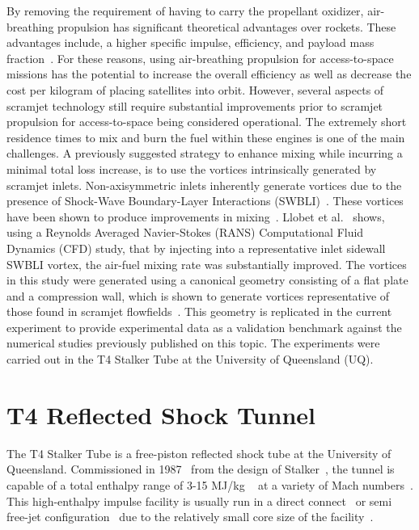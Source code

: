 \documentclass{AIAA}
\begin{document}
By removing the requirement of having to carry the propellant oxidizer, air-breathing propulsion has significant theoretical advantages over rockets.
These advantages include, a higher specific impulse, efficiency, and payload mass fraction~\cite{SmartTetlow,CookHueter}.
For these reasons, using air-breathing propulsion for access-to-space missions has the potential to increase the overall efficiency as well as decrease the cost per kilogram of placing satellites into orbit.
However, several aspects of scramjet technology still require substantial improvements prior to scramjet propulsion for access-to-space being considered operational.
The extremely short residence times to mix and burn the fuel within these engines is one of the main challenges.
A previously suggested strategy to enhance mixing while incurring a minimal total loss increase, is to use the vortices intrinsically generated by scramjet inlets.
Non-axisymmetric inlets inherently generate vortices due to the presence of Shock-Wave Boundary-Layer Interactions (SWBLI)~\cite{Alvi}.
These vortices have been shown to produce improvements in mixing~\cite{SpacePlanes_paper2015,Llobet_PlumeElongation}.
Llobet et al.~\cite{Llobet_PlumeElongation} shows, using a Reynolds Averaged Navier-Stokes (RANS) Computational Fluid Dynamics (CFD) study, that by injecting into a representative inlet sidewall SWBLI vortex, the air-fuel mixing rate was substantially improved.
The vortices in this study were generated using a canonical geometry consisting of a flat plate and a compression wall, which is shown to generate vortices representative of those found in scramjet flowfields~\cite{AFMCpaper2014}.
This geometry is replicated in the current experiment to provide experimental data as a validation benchmark against the numerical studies previously published on this topic.
The experiments were carried out in the T4 Stalker Tube at the University of Queensland (UQ).



\section{T4 Reflected Shock Tunnel}
	\label{sec:T4Literature}
	
The T4 Stalker Tube is a free-piston reflected shock tube at the University of Queensland. 
Commissioned in 1987~\cite{Doherty:PhD_Thesis_Scram_M10} from the design of Stalker~\cite{Stalker1966}, the tunnel is capable of a total enthalpy range of 3-15 MJ/kg ~\cite{Doherty:PhD_Thesis_Scram_M10} at a variety of Mach numbers~\cite{Tanimizu:Phd_Thesis}.
This high-enthalpy impulse facility is usually run in a direct connect~\cite{Kirchhartz:PhD_Thesis_Boundary_Combustion, RidingsAndrewNoel2015Iops} or semi free-jet configuration~\cite{Chan:Boundary_Layer_Combustion_Perturbation, Wise_Thesis} due to the relatively small core size of the facility~\cite{Itoh1999, Stalker_2005}.
\end{document}

